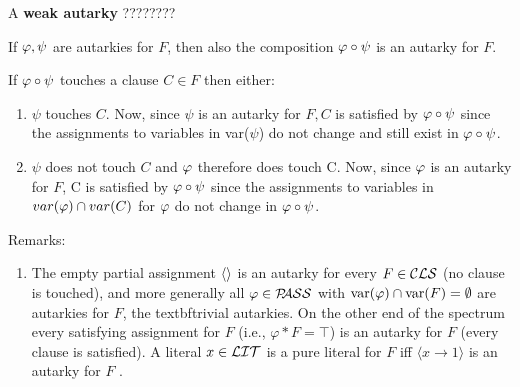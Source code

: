 \documentclass[12pt]{book}
\begin{document}
\begin{defi}\label{def:weak autarky}
      A \textbf{weak autarky} ????????
\end{defi} 
\begin{lem}\label{lem:compaut}
      If $\varphi, \psi$ are autarkies for $F$, then also the composition $\varphi \circ \psi$ is an autarky for $F$.
\end{lem}
\pr If $\varphi \circ \psi$ touches a clause $C \in F$ then either:
\begin{enumerate}
      \item $\psi$ touches $C$. Now, since $\psi$ is an autarky for $F, C$ is satisfied by $\varphi \circ \psi$ since the assignments to variables in var($\psi$) 
	  do not  change and still exist in $\varphi \circ \psi$. \item $\psi$ does not touch $C$ and $\varphi$ therefore does touch C. Now, since $\varphi$ is an autarky 
	  for $F$, C is satisfied by $\varphi \circ \psi$ since the assignments to variables in $var(\varphi) \cap var(C)$ for $\varphi$ do not change in $\varphi \circ \psi$. 
\end{enumerate}
Remarks:
\begin{enumerate}
      \item The empty partial assignment $\langle  \rangle$ is an autarky for every $F \in \mathcal{CLS}$ (no clause is touched), and more generally all $\varphi \in \mathcal{P\hspace{-0.32em}ASS}$ with $\operatorname{var}(\varphi) \cap \operatorname{var}(F) = \emptyset$
      are autarkies for $F$, the textbf{trivial autarkies}. On the other end of the spectrum every satisfying assignment for $F$ (i.e., $\varphi * F = \top $) is an autarky for $F$ 
	  (every clause is satisfied). A literal $x \in \mathcal{LIT}$ is a pure literal for $F$ iff $\langle x \rightarrow 1 \rangle $ is an autarky for $F$ \cite{h9}.
\end{enumerate}
\end{document}
